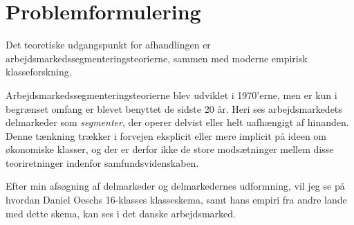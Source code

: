 




\section{Problemformulering}



Det teoretiske udgangspunkt for afhandlingen er arbejdsmarkedssegmenteringsteorierne, sammen med moderne empirisk klasseforskning. 

Arbejdsmarkedssegmenteringsteorierne blev udviklet i 1970'erne, men er kun i begrænset omfang er blevet benyttet de sidste 20 år. Heri ses arbejdsmarkedets delmarkeder som \emph{segmenter}, der operer delvist eller helt uafhængigt af hinanden. Denne tænkning trækker i forvejen eksplicit eller mere implicit på ideen om økonomiske klasser, og der er derfor ikke de store modsætninger mellem disse teoriretninger indenfor samfundsvidenskaben.  

Efter min afsøgning af delmarkeder og delmarkedernes udformning, vil jeg se på hvordan Daniel Oeschs 16-klasses klasseskema, samt hans empiri fra andre lande med dette skema, kan ses i det danske arbejdsmarked. 

